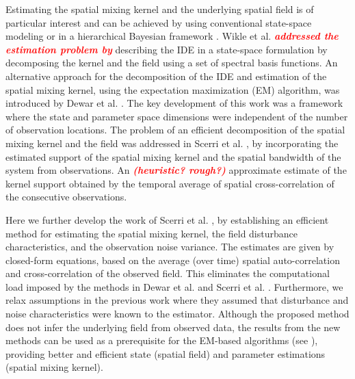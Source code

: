 \documentclass[10pt,twocolumn,twoside]{IEEEtran}
\newcommand{\dean}[1]{\textsf{\emph{\textbf{\textcolor{red}{#1}}}}}
\begin{document}
Estimating the spatial mixing kernel and the underlying spatial field is of particular interest and can be achieved by using conventional state-space modeling \cite{Dewar2009,Scerri2009} or in a hierarchical Bayesian framework \cite{Wikle1999,Xu2005,Wikle2011}. Wikle et al. \cite{Wikle2002} \dean{addressed the estimation problem by} describing the IDE in a state-space formulation by decomposing the kernel and the field using a set of spectral basis functions. An alternative approach for the decomposition of the IDE and estimation of the spatial mixing kernel, using the expectation maximization (EM) algorithm, was introduced by Dewar et al. \cite{Dewar2009}. The key development of this work was a framework where the state and parameter space dimensions were independent of the number of observation locations. %
The problem of an efficient decomposition of the spatial mixing kernel and the field was addressed in Scerri et al. \cite{Scerri2009}, by incorporating the estimated support of the spatial mixing kernel and the spatial bandwidth of the system from observations. 
An \dean{(heuristic? rough?)} approximate estimate of the kernel support obtained by the temporal average of spatial cross-correlation of the consecutive observations.  

Here we further develop the work of Scerri et al. \cite{Scerri2009}, by establishing an efficient method for estimating the spatial mixing kernel, the field disturbance characteristics, and the observation noise variance. The estimates are given by closed-form equations, based on the average (over time) spatial auto-correlation and cross-correlation of the observed field. This eliminates the computational load imposed by the methods in Dewar et al. and Scerri et al. \cite{Dewar2009,Scerri2009}. Furthermore, we relax assumptions in the previous work where they assumed that disturbance and noise characteristics were known to the estimator. Although the proposed method does not infer the underlying field from observed data, the results from the new methods can be used as a prerequisite for the EM-based algorithms (see \cite{Dewar2009,Xu2007}), providing better and efficient state (spatial field) and parameter estimations (spatial mixing kernel). 
\end{document}
